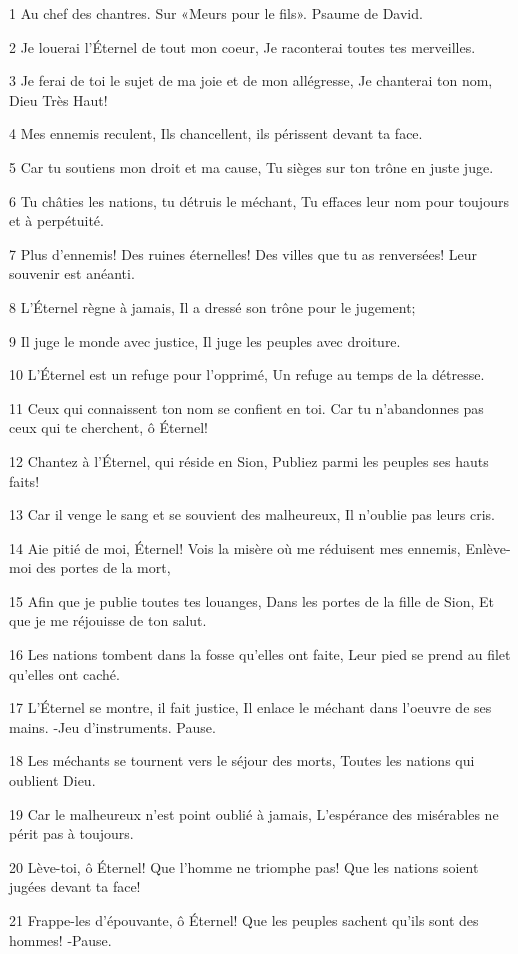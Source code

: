 \par 1 Au chef des chantres. Sur «Meurs pour le fils». Psaume de David.
\par 2 Je louerai l'Éternel de tout mon coeur, Je raconterai toutes tes merveilles.
\par 3 Je ferai de toi le sujet de ma joie et de mon allégresse, Je chanterai ton nom, Dieu Très Haut!
\par 4 Mes ennemis reculent, Ils chancellent, ils périssent devant ta face.
\par 5 Car tu soutiens mon droit et ma cause, Tu sièges sur ton trône en juste juge.
\par 6 Tu châties les nations, tu détruis le méchant, Tu effaces leur nom pour toujours et à perpétuité.
\par 7 Plus d'ennemis! Des ruines éternelles! Des villes que tu as renversées! Leur souvenir est anéanti.
\par 8 L'Éternel règne à jamais, Il a dressé son trône pour le jugement;
\par 9 Il juge le monde avec justice, Il juge les peuples avec droiture.
\par 10 L'Éternel est un refuge pour l'opprimé, Un refuge au temps de la détresse.
\par 11 Ceux qui connaissent ton nom se confient en toi. Car tu n'abandonnes pas ceux qui te cherchent, ô Éternel!
\par 12 Chantez à l'Éternel, qui réside en Sion, Publiez parmi les peuples ses hauts faits!
\par 13 Car il venge le sang et se souvient des malheureux, Il n'oublie pas leurs cris.
\par 14 Aie pitié de moi, Éternel! Vois la misère où me réduisent mes ennemis, Enlève-moi des portes de la mort,
\par 15 Afin que je publie toutes tes louanges, Dans les portes de la fille de Sion, Et que je me réjouisse de ton salut.
\par 16 Les nations tombent dans la fosse qu'elles ont faite, Leur pied se prend au filet qu'elles ont caché.
\par 17 L'Éternel se montre, il fait justice, Il enlace le méchant dans l'oeuvre de ses mains. -Jeu d'instruments. Pause.
\par 18 Les méchants se tournent vers le séjour des morts, Toutes les nations qui oublient Dieu.
\par 19 Car le malheureux n'est point oublié à jamais, L'espérance des misérables ne périt pas à toujours.
\par 20 Lève-toi, ô Éternel! Que l'homme ne triomphe pas! Que les nations soient jugées devant ta face!
\par 21 Frappe-les d'épouvante, ô Éternel! Que les peuples sachent qu'ils sont des hommes! -Pause.

